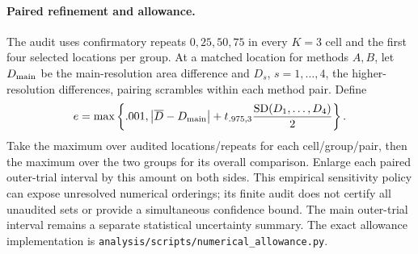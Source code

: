 \paragraph{Paired refinement and allowance.}
The audit uses confirmatory repeats $0,25,50,75$ in every $K=3$ cell and the first four selected locations per group. At a matched location for methods $A,B$, let $D_{\rm main}$ be the main-resolution area difference and $D_s$, $s=1,\ldots,4$, the higher-resolution differences, pairing scrambles within each method pair. Define
\begin{equation}
 e=\max\left\{.001,\left|\overline D-D_{\rm main}\right|+t_{.975,3}\frac{\operatorname{SD}(D_1,\ldots,D_4)}{2}\right\}.
 \label{eq:allowance}
\end{equation}
Take the maximum over audited locations/repeats for each cell/group/pair, then the maximum over the two groups for its overall comparison. Enlarge each paired outer-trial interval by this amount on both sides. This empirical sensitivity policy can expose unresolved numerical orderings; its finite audit does not certify all unaudited sets or provide a simultaneous confidence bound. The main outer-trial interval remains a separate statistical uncertainty summary. The exact allowance implementation is \texttt{analysis/scripts/numerical\_allowance.py}.
